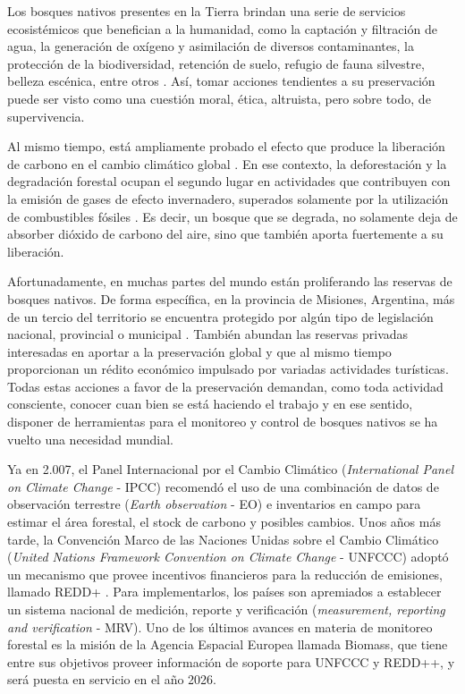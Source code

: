 
Los bosques nativos presentes en la Tierra brindan una serie de servicios ecosistémicos que benefician a la humanidad, como la captación y filtración de agua, la generación de oxígeno y asimilación de diversos contaminantes, la protección de la biodiversidad, retención de suelo, refugio de fauna silvestre, belleza escénica, entre otros \cite{lin_optimization_2023}. Así, tomar acciones tendientes a su preservación puede ser visto como una cuestión moral, ética, altruista, pero sobre todo, de supervivencia.

Al mismo tiempo, está ampliamente probado el efecto que produce la liberación de carbono en el cambio climático global \cite{noauthor_pdf_nodate, kabir_climate_2023}. En ese contexto, la deforestación y la degradación forestal ocupan el segundo lugar en actividades que contribuyen con la emisión de gases de efecto invernadero, superados solamente por la utilización de combustibles fósiles \cite{chiriaco_deforestation_2024}. Es decir, un bosque que se degrada, no solamente deja de absorber dióxido de carbono del aire, sino que también aporta fuertemente a su liberación.

Afortunadamente, en muchas partes del mundo están proliferando las reservas de bosques nativos. De forma específica, en la provincia de Misiones, Argentina, más de un tercio del territorio se encuentra protegido por algún tipo de legislación nacional, provincial o municipal \cite{noauthor_revista_nodate}. También abundan las reservas privadas interesadas en aportar a la preservación global y que al mismo tiempo proporcionan un rédito económico impulsado por variadas actividades turísticas. Todas estas acciones a favor de la preservación demandan, como toda actividad consciente, conocer cuan bien se está haciendo el trabajo y en ese sentido, disponer de herramientas para el monitoreo y control de bosques nativos se ha vuelto una necesidad mundial.

Ya en 2.007, el Panel Internacional por el Cambio Climático (\textit{International Panel on Climate Change} - IPCC) recomendó el uso de una combinación de datos de observación terrestre (\textit{Earth observation} - EO) e inventarios en campo para estimar el área forestal, el stock de carbono y posibles cambios.  Unos años más tarde, la Convención Marco de las Naciones Unidas sobre el Cambio Climático (\textit{United Nations Framework Convention on Climate Change} - UNFCCC) adoptó un mecanismo que provee incentivos financieros para la reducción de emisiones, llamado REDD+ \cite{pistorius_red_2012}. Para implementarlos, los países son apremiados a establecer un sistema nacional de medición, reporte y verificación (\textit{measurement, reporting and verification} - MRV). Uno de los últimos avances en materia de monitoreo forestal es la misión de la Agencia Espacial Europea llamada Biomass, que tiene entre sus objetivos proveer información de soporte para UNFCCC y REDD++, y será puesta en servicio en el año 2026.

